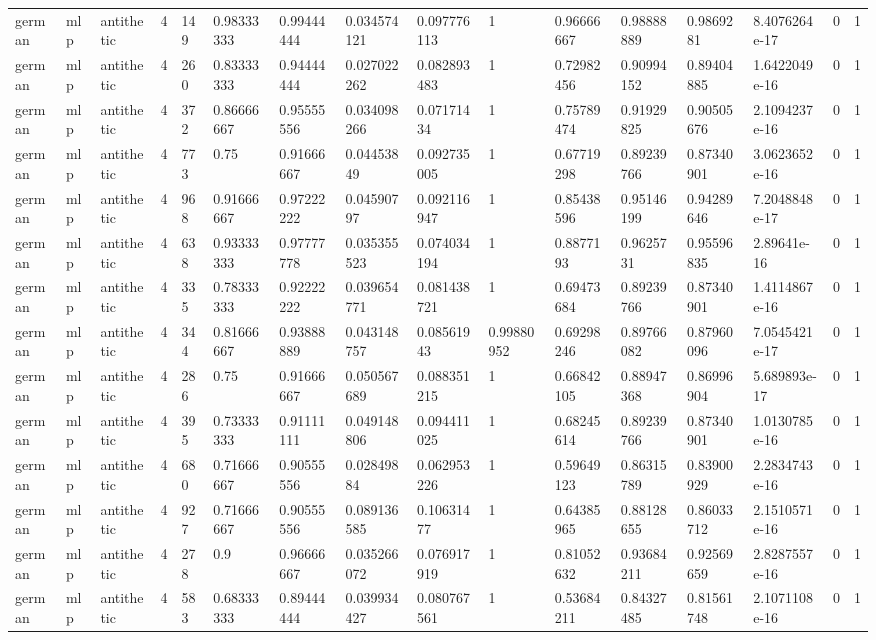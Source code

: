 \begin{tabular}{llllllllllllllll}
german & mlp & antithetic & 4 & 149 & 0.98333333 & 0.99444444 & 0.034574121 & 0.097776113 & 1 & 0.96666667 & 0.98888889 & 0.9869281 & 8.4076264e-17 & 0 & 1 \\
german & mlp & antithetic & 4 & 260 & 0.83333333 & 0.94444444 & 0.027022262 & 0.082893483 & 1 & 0.72982456 & 0.90994152 & 0.89404885 & 1.6422049e-16 & 0 & 1 \\
german & mlp & antithetic & 4 & 372 & 0.86666667 & 0.95555556 & 0.034098266 & 0.07171434 & 1 & 0.75789474 & 0.91929825 & 0.90505676 & 2.1094237e-16 & 0 & 1 \\
german & mlp & antithetic & 4 & 773 & 0.75 & 0.91666667 & 0.04453849 & 0.092735005 & 1 & 0.67719298 & 0.89239766 & 0.87340901 & 3.0623652e-16 & 0 & 1 \\
german & mlp & antithetic & 4 & 968 & 0.91666667 & 0.97222222 & 0.04590797 & 0.092116947 & 1 & 0.85438596 & 0.95146199 & 0.94289646 & 7.2048848e-17 & 0 & 1 \\
german & mlp & antithetic & 4 & 638 & 0.93333333 & 0.97777778 & 0.035355523 & 0.074034194 & 1 & 0.8877193 & 0.9625731 & 0.95596835 & 2.89641e-16 & 0 & 1 \\
german & mlp & antithetic & 4 & 335 & 0.78333333 & 0.92222222 & 0.039654771 & 0.081438721 & 1 & 0.69473684 & 0.89239766 & 0.87340901 & 1.4114867e-16 & 0 & 1 \\
german & mlp & antithetic & 4 & 344 & 0.81666667 & 0.93888889 & 0.043148757 & 0.08561943 & 0.99880952 & 0.69298246 & 0.89766082 & 0.87960096 & 7.0545421e-17 & 0 & 1 \\
german & mlp & antithetic & 4 & 286 & 0.75 & 0.91666667 & 0.050567689 & 0.088351215 & 1 & 0.66842105 & 0.88947368 & 0.86996904 & 5.689893e-17 & 0 & 1 \\
german & mlp & antithetic & 4 & 395 & 0.73333333 & 0.91111111 & 0.049148806 & 0.094411025 & 1 & 0.68245614 & 0.89239766 & 0.87340901 & 1.0130785e-16 & 0 & 1 \\
german & mlp & antithetic & 4 & 680 & 0.71666667 & 0.90555556 & 0.02849884 & 0.062953226 & 1 & 0.59649123 & 0.86315789 & 0.83900929 & 2.2834743e-16 & 0 & 1 \\
german & mlp & antithetic & 4 & 927 & 0.71666667 & 0.90555556 & 0.089136585 & 0.10631477 & 1 & 0.64385965 & 0.88128655 & 0.86033712 & 2.1510571e-16 & 0 & 1 \\
german & mlp & antithetic & 4 & 278 & 0.9 & 0.96666667 & 0.035266072 & 0.076917919 & 1 & 0.81052632 & 0.93684211 & 0.92569659 & 2.8287557e-16 & 0 & 1 \\
german & mlp & antithetic & 4 & 583 & 0.68333333 & 0.89444444 & 0.039934427 & 0.080767561 & 1 & 0.53684211 & 0.84327485 & 0.81561748 & 2.1071108e-16 & 0 & 1 \\

\end{tabular}
